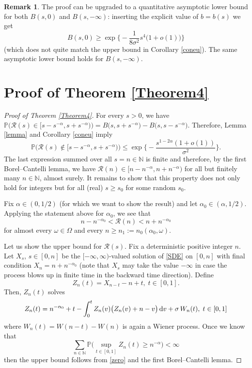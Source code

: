 \documentclass[sn-mathphys-num]{sn-jnl}
\theoremstyle{definition}
\newtheorem{rem}[thm]{Remark}
\newcommand{\scr}[1]{\mathscr #1}
\numberwithin{equation}{section} \theoremstyle{remark}
\renewcommand{\d}{\hbox{d}}
\def\N{\mathbb N} \def\kk{\kappa} \def\m{{\bf m}}
\def\d{\text{\rm{d}}} \def\bb{\beta} \def\aa{\alpha} \def\D{\scr D}
\def\RR{\mathscr R}
\def\P{\mathbb P}
\newcommand{\1}{\mathbbm{1}}
\begin{document}
    \begin{rem}
      The proof can be upgraded to a quantitative asymptotic lower bound for both $B(s,0)$ and $B(s,-\infty)$: inserting the explicit value of $b=b(s)$ we get
      $$
B(s,0)\geq \exp\Big\{-\frac 1{8 \sigma^2}s^4\big(1+o(1)\big)\Big\}
$$
(which does not quite match the upper bound in Corollary \ref{coneu}). The same asymptotic lower bound holds for $B(s,-\infty)$. 
      \end{rem}
    \section{Proof of Theorem \ref{Theorem4}}
 \begin{proof}[Proof of Theorem \ref{Theorem4}]
   For every $s > 0$, we have $\P\big(\RR(s)\in \big[s-s^{-\alpha}, s+s^{-\alpha})\big)= B\big(s,s +s^{-\alpha}\big)-B\big(s,s -s^{-\alpha}\big)$. Therefore, Lemma \ref{lemma} and Corollary \ref{coneu} imply
   $$
   \P\big(\RR(s)\notin \big[s-s^{-\alpha}, s+s^{-\alpha})\big)\leq \exp\Big\{-\frac{s^{1-2\alpha}(1+o(1))}{\sigma^2}\Big\}.
   $$
   The last expression summed over all $s=n\in \N$ is finite and therefore, by the first Borel--Cantelli lemma,  we have $\RR(n)\in \big[n-n^{-\alpha}, n+n^{-\alpha}\big)$ for all but finitely many $n \in \N$, almost surely. It remains to show that this property does not only hold for integers but for all (real) $s \geq s_0$ for some random $s_0$.
 
 Fix $\alpha \in (0,1/2)$ (for which we want to show the result) and let $\alpha_0\in (\alpha,1/2)$. Applying the statement above for $\alpha_0$, we see that 
\begin{equation}\label{zero}
n-n^{-\alpha_0} < \RR(n)<n+n^{-\alpha_0}
\end{equation}
for almost every $\omega \in \Omega$ and every $n \geq n_1:=n_0(\alpha_0,\omega)$. 

Let us show the upper bound for $\RR(s)$.  
Fix a deterministic positive integer $n$.  Let $X_s$, $s\in [0,n]$ be the $[-\infty,\infty)$-valued solution of \eqref{SDE} on $[0,n]$ with final condition $X_n=n+n^{-\alpha_0}$ (note that $X_s$ may take the value $-\infty$ in case the process blows up in finite time in the backward time direction). Define
$$
Z_n(t)=X_{n-t}-n+t,\;t\in [0,1].
$$
Then, $Z_n(t)$  solves 
$$
Z_n(t)=n^{-\alpha_0}+t-\int_0^tZ_n(v)\big(Z_n(v)+n-v\big)\,\d v+\sigma\,W_n(t),\;t \in [0,1]
$$ where $W_n(t)=W(n-t)-W(n)$ is again a Wiener process. Once we know that
\begin{equation}\label{once}
\sum_{n\in\N}\P\big( \sup_{t \in [0,1]}Z_n(t) \geq n^{-\alpha}\big)<\infty
\end{equation}
then the upper bound follows from \eqref{zero} and the first Borel--Cantelli lemma.


\end{proof}
\end{document}
